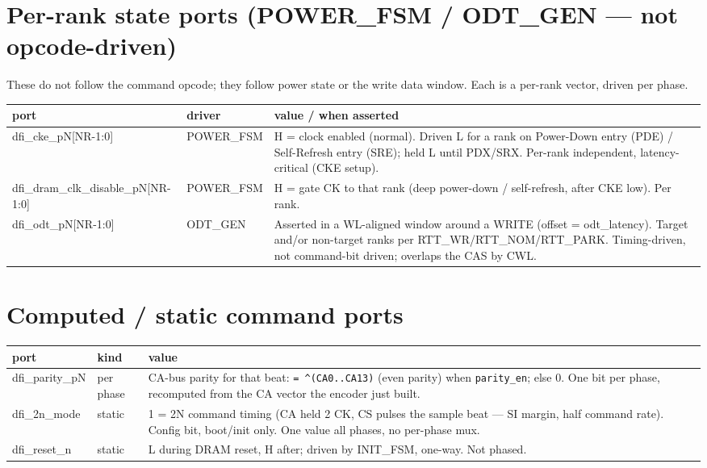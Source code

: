 \documentclass[9pt]{extarticle}
\newcommand{\op}[1]{\cellcolor{opc}#1}
\newcommand{\fd}[1]{\cellcolor{fld}#1}
\begin{document}
\section{Per-rank state ports  (POWER\_FSM / ODT\_GEN --- not opcode-driven)}
{\footnotesize These do not follow the command opcode; they follow power state or the write data
window. Each is a per-rank vector, driven per phase.}
\smallskip
\begin{center}
\begin{tabular}{F K M}
\toprule
{}\textbf{port} & \textbf{driver} & \textbf{value / when asserted}\\ \midrule
dfi\_cke\_pN[NR-1:0] & POWER\_FSM & H = clock enabled (normal). Driven L for a rank on Power-Down entry (PDE) / Self-Refresh entry (SRE); held L until PDX/SRX. Per-rank independent, latency-critical (CKE setup).\\
dfi\_dram\_clk\_disable\_pN[NR-1:0] & POWER\_FSM & H = gate CK to that rank (deep power-down / self-refresh, after CKE low). Per rank.\\
dfi\_odt\_pN[NR-1:0] & ODT\_GEN & Asserted in a WL-aligned window around a WRITE (offset = odt\_latency). Target and/or non-target ranks per RTT\_WR/RTT\_NOM/RTT\_PARK. Timing-driven, not command-bit driven; overlaps the CAS by CWL.\\
\bottomrule
\end{tabular}
\end{center}

\section{Computed / static command ports}
\begin{center}
\begin{tabular}{F K M}
\toprule
{}\textbf{port} & \textbf{kind} & \textbf{value}\\ \midrule
dfi\_parity\_pN & \fd{per phase} & CA-bus parity for that beat: \texttt{= \textasciicircum(CA0..CA13)} (even parity) when \texttt{parity\_en}; else 0. One bit per phase, recomputed from the CA vector the encoder just built.\\
dfi\_2n\_mode & \op{static} & 1 = 2N command timing (CA held 2 CK, CS pulses the sample beat --- SI margin, half command rate). Config bit, boot/init only. One value all phases, no per-phase mux.\\
dfi\_reset\_n & \op{static} & L during DRAM reset, H after; driven by INIT\_FSM, one-way. Not phased.\\
\bottomrule
\end{tabular}
\end{center}
\end{document}
